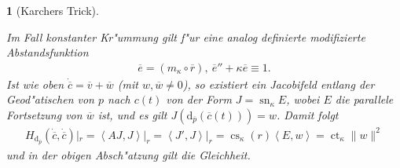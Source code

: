 \documentclass[paper=A4, twoside, chapterprefix=true, bibliography=totoc, headsepline]{scrbook}
\DeclareMathOperator{\calJ}{\mathcal{J}}
\DeclareMathOperator{\cs}{cs} %
\DeclareMathOperator{\ct}{ct} %
\DeclareMathOperator{\sn}{sn} %
\newcommand{\dop}{\mathrm{d}}
\theoremstyle{plain}
\theoremstyle{nonumberplain}
\theoremstyle{empty}
\newtheorem{emptythm}{}%
\theoremstyle{break}
\begin{document}
\begin{emptythm}[Karchers Trick]
\begin{center}
\end{center}
  Im Fall konstanter Kr"ummung gilt f"ur eine analog definierte modifizierte Abstandsfunktion
  \begin{align*}
    \overline e = (m_{\kappa} \circ \overline r), \
    \overline e '' + \kappa \overline e \equiv 1.
  \end{align*}
  Ist wie oben $\dot{\overline c} = \overline v + \overline w$ (mit $w,\overline w \neq 0$), so existiert ein Jacobifeld entlang der Geod"atischen von $p$ nach $c(t)$ von der Form $J = \sn_{\kappa} E$, wobei $E$ die parallele Fortsetzung von $\overline w$ ist, und es gilt $J(\dop_{\overline p}(\overline c(t))) = w$.
  Damit folgt
  \begin{align*}
    H_{\dop_{\overline p}}(\dot{\overline c}, \dot{\overline c})|_r = \left<AJ,J\right>|_r
    = \left<J',J\right>|_r
    = \cs_{\kappa}(r)\left<E,w\right>
    = \ct_{\kappa}\|w\|^2
  \end{align*}
  und in der obigen Absch"atzung gilt die Gleichheit.
\end{emptythm}
\end{document}
